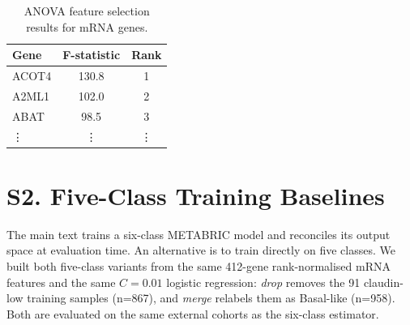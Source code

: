 \documentclass[11pt,a4paper]{article}
\begin{document}
\begin{table}[htbp]
\centering
\caption{ANOVA feature selection results for mRNA genes.}
\label{tab:feature_selection_supp}
\begin{tabular}{lcc}
\toprule
\textbf{Gene} & \textbf{F-statistic} & \textbf{Rank} \\
\midrule
ACOT4 & 130.8 & 1 \\
A2ML1 & 102.0 & 2 \\
ABAT & 98.5 & 3 \\
\vdots & \vdots & \vdots \\
\bottomrule
\end{tabular}
\end{table}


\section*{S2. Five-Class Training Baselines}
\label{supp:fiveclass}

The main text trains a six-class METABRIC model and reconciles its output space at
evaluation time. An alternative is to train directly on five classes. We built both
five-class variants from the same 412-gene rank-normalised mRNA features and the same
$C{=}0.01$ logistic regression: \emph{drop} removes the 91 claudin-low training samples
(n=867), and \emph{merge} relabels them as Basal-like (n=958). Both are evaluated on the
same external cohorts as the six-class estimator.
\end{document}
